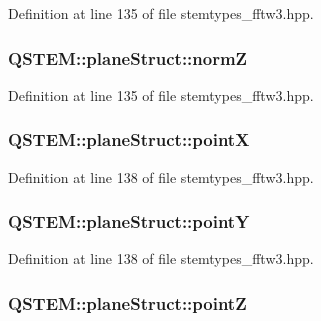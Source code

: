 Definition at line 135 of file stemtypes\-\_\-fftw3.\-hpp.

\hypertarget{struct_q_s_t_e_m_1_1plane_struct_a367a661f4ef249286b60d47e412c1320}{
\subsubsection[{norm\-Z}]{ Q\-S\-T\-E\-M\-::plane\-Struct\-::norm\-Z}}\label{struct_q_s_t_e_m_1_1plane_struct_a367a661f4ef249286b60d47e412c1320}


Definition at line 135 of file stemtypes\-\_\-fftw3.\-hpp.

\hypertarget{struct_q_s_t_e_m_1_1plane_struct_a1952bc84ab244196aed7fb3c713df828}{
\subsubsection[{point\-X}]{ Q\-S\-T\-E\-M\-::plane\-Struct\-::point\-X}}\label{struct_q_s_t_e_m_1_1plane_struct_a1952bc84ab244196aed7fb3c713df828}


Definition at line 138 of file stemtypes\-\_\-fftw3.\-hpp.

\hypertarget{struct_q_s_t_e_m_1_1plane_struct_a756cf2976a00c2ed16ec84a7075f47fa}{
\subsubsection[{point\-Y}]{ Q\-S\-T\-E\-M\-::plane\-Struct\-::point\-Y}}\label{struct_q_s_t_e_m_1_1plane_struct_a756cf2976a00c2ed16ec84a7075f47fa}


Definition at line 138 of file stemtypes\-\_\-fftw3.\-hpp.

\hypertarget{struct_q_s_t_e_m_1_1plane_struct_a382329e60f79bb5bde993bdecd30f553}{
\subsubsection[{point\-Z}]{ Q\-S\-T\-E\-M\-::plane\-Struct\-::point\-Z}}\label{struct_q_s_t_e_m_1_1plane_struct_a382329e60f79bb5bde993bdecd30f553}


